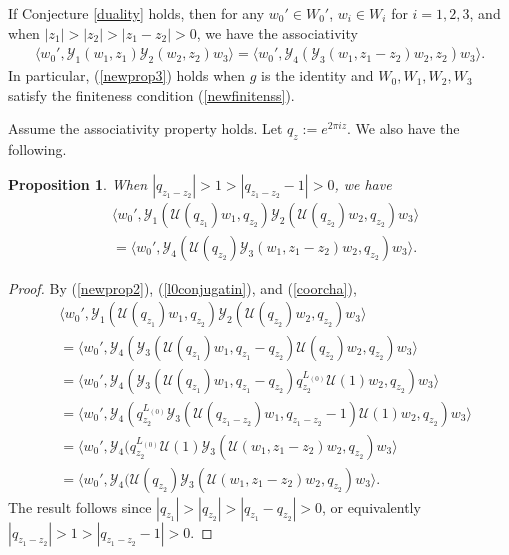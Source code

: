 \documentclass[9pt]{amsart}
\newtheorem{proposition}{Proposition}[section]
\begin{document}
If Conjecture \ref{duality} holds, then for any $w_0' \in W_0'$, $w_i \in W_i$ for $i = 1, 2, 3$, and when \(|z_1| > |z_2| > |z_1 - z_2| > 0\), we have the associativity
\begin{align}\label{newprop3}
    \langle w_0', \mathcal{Y}_1(w_1, z_1) \mathcal{Y}_2(w_2, z_2) w_3 \rangle 
    = \langle w_0', \mathcal{Y}_4(\mathcal{Y}_3(w_1, z_1 - z_2) w_2, z_2) w_3 \rangle.
\end{align}
In particular, (\ref{newprop3}) holds when \(g\) is the identity and \(W_0, W_1, W_2, W_3\) satisfy the finiteness condition (\ref{newfinitenss}).

Assume the associativity property holds. Let \(q_z := e^{2\pi i z}\). We also have the following.

\begin{proposition}
When \(|q_{z_1 - z_2}| > 1 > |q_{z_1 - z_2} - 1| > 0\), we have
\begin{align*}
    &\langle w_0', \mathcal{Y}_1(\mathcal{U}(q_{z_1}) w_1, q_{z_2}) \mathcal{Y}_2(\mathcal{U}(q_{z_2}) w_2, q_{z_2}) w_3 \rangle \\
    &= \langle w_0', \mathcal{Y}_4(\mathcal{U}(q_{z_2}) \mathcal{Y}_3(w_1, z_1 - z_2) w_2, q_{z_2}) w_3 \rangle.
\end{align*}
\end{proposition}

\begin{proof}
By (\ref{newprop2}), (\ref{l0conjugatin}), and (\ref{coorcha}),
\begin{align*}
    &\langle w_0', \mathcal{Y}_1(\mathcal{U}(q_{z_1}) w_1, q_{z_2}) \mathcal{Y}_2(\mathcal{U}(q_{z_2}) w_2, q_{z_2}) w_3 \rangle \\
    &= \langle w_0', \mathcal{Y}_4(\mathcal{Y}_3(\mathcal{U}(q_{z_1}) w_1, q_{z_1} - q_{z_2}) \mathcal{U}(q_{z_2}) w_2, q_{z_2}) w_3 \rangle \\
    &= \langle w_0', \mathcal{Y}_4(\mathcal{Y}_3(\mathcal{U}(q_{z_1}) w_1, q_{z_1} - q_{z_2}) q_{z_2}^{L_{(0)}} \mathcal{U}(1) w_2, q_{z_2}) w_3 \rangle \\
    &= \langle w_0', \mathcal{Y}_4(q_{z_2}^{L_{(0)}} \mathcal{Y}_3(\mathcal{U}(q_{z_1 - z_2}) w_1, q_{z_1 - z_2} - 1) \mathcal{U}(1) w_2, q_{z_2}) w_3 \rangle \\
    &= \langle w_0', \mathcal{Y}_4(q_{z_2}^{L_{(0)}} \mathcal{U}(1) \mathcal{Y}_3(\mathcal{U}(w_1, z_1 - z_2) w_2, q_{z_2}) w_3 \rangle \\
    &= \langle w_0', \mathcal{Y}_4(\mathcal{U}(q_{z_2}) \mathcal{Y}_3(\mathcal{U}(w_1, z_1 - z_2) w_2, q_{z_2}) w_3 \rangle.
\end{align*}
The result follows since \( |q_{z_1}| > |q_{z_2}| > |q_{z_1} - q_{z_2}| > 0 \), or equivalently \( |q_{z_1 - z_2}| > 1 > |q_{z_1 - z_2} - 1| > 0 \).
\end{proof}
\color{black}
\end{document}
